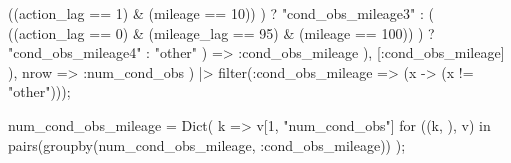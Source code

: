 \documentclass[
  letterpaper,
  DIV=11,
  numbers=noendperiod]{scrreprt}
\newenvironment{Shaded}{\begin{snugshade}}{\end{snugshade}}
\newcommand{\ControlFlowTok}[1]{\textcolor[rgb]{0.00,0.23,0.31}{#1}}
\newcommand{\FloatTok}[1]{\textcolor[rgb]{0.68,0.00,0.00}{#1}}
\newcommand{\FunctionTok}[1]{\textcolor[rgb]{0.28,0.35,0.67}{#1}}
\newcommand{\KeywordTok}[1]{\textcolor[rgb]{0.00,0.23,0.31}{#1}}
\newcommand{\NormalTok}[1]{\textcolor[rgb]{0.00,0.23,0.31}{#1}}
\newcommand{\OperatorTok}[1]{\textcolor[rgb]{0.37,0.37,0.37}{#1}}
\newcommand{\StringTok}[1]{\textcolor[rgb]{0.13,0.47,0.30}{#1}}
\begin{document}
\begin{Shaded}
\begin{Highlighting}[]
\NormalTok{                    ((action\_lag }\OperatorTok{==} \FloatTok{1}\NormalTok{) }\OperatorTok{\&}\NormalTok{ (mileage }\OperatorTok{==} \FloatTok{10}\NormalTok{))}
\NormalTok{                    ) ? }\StringTok{"cond\_obs\_mileage3"} \OperatorTok{:}
\NormalTok{                (}
\NormalTok{                    ((action\_lag }\OperatorTok{==} \FloatTok{0}\NormalTok{) }\OperatorTok{\&}\NormalTok{ (mileage\_lag }\OperatorTok{==} \FloatTok{95}\NormalTok{) }\OperatorTok{\&}\NormalTok{ (mileage }\OperatorTok{==} \FloatTok{100}\NormalTok{))}
\NormalTok{                    ) ? }\StringTok{"cond\_obs\_mileage4"} \OperatorTok{:}
                \StringTok{"other"}
\NormalTok{            ) }\OperatorTok{=\textgreater{}}
            \OperatorTok{:}\NormalTok{cond\_obs\_mileage}
\NormalTok{            ),}
\NormalTok{        [}\OperatorTok{:}\NormalTok{cond\_obs\_mileage]}
\NormalTok{        ),}
\NormalTok{    nrow }\OperatorTok{=\textgreater{}} \OperatorTok{:}\NormalTok{num\_cond\_obs}
\NormalTok{) }\OperatorTok{|\textgreater{}} \FunctionTok{filter}\NormalTok{(}\OperatorTok{:}\NormalTok{cond\_obs\_mileage }\OperatorTok{=\textgreater{}}\NormalTok{ (x }\OperatorTok{{-}\textgreater{}}\NormalTok{ (x }\OperatorTok{!=} \StringTok{"other"}\NormalTok{)));}

\NormalTok{num\_cond\_obs\_mileage }\OperatorTok{=} \FunctionTok{Dict}\NormalTok{(}
\NormalTok{    k }\OperatorTok{=\textgreater{}}\NormalTok{ v[}\FloatTok{1}\NormalTok{, }\StringTok{"num\_cond\_obs"}\NormalTok{] }
    \ControlFlowTok{for}\NormalTok{ ((k, ), v) }\KeywordTok{in} \FunctionTok{pairs}\NormalTok{(}\FunctionTok{groupby}\NormalTok{(num\_cond\_obs\_mileage, }\OperatorTok{:}\NormalTok{cond\_obs\_mileage))}
\NormalTok{    );}
\end{Highlighting}
\end{Shaded}
\end{document}
